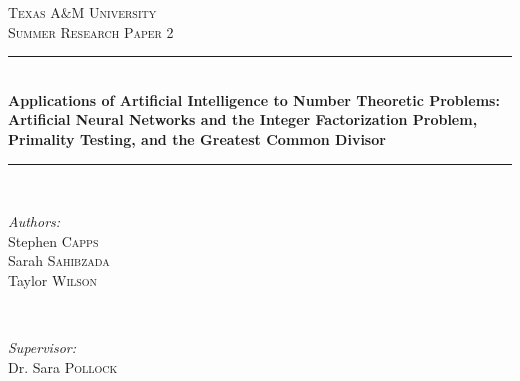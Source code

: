 \documentclass[11pt]{article}
\begin{document}
\begin{titlepage}

\newcommand{\HRule}{\rule{\linewidth}{0.5mm}} 

\center %
 

\textsc{\LARGE Texas A$\&$M University}\\[1.5cm] 
\textsc{\Large Summer Research Paper 2}\\[0.5cm] %


\HRule \\[0.4cm]
{ \huge \bfseries Applications of Artificial Intelligence to Number Theoretic Problems: Artificial Neural Networks and the Integer Factorization Problem, Primality Testing, and the Greatest Common Divisor}\\[0.4cm]  %
\HRule \\[1.5cm]
 

\begin{minipage}{0.4\textwidth}
\begin{flushleft} \large
\emph{Authors:}\\
Stephen \textsc{Capps}\\
Sarah \textsc{Sahibzada}\\
Taylor \textsc{Wilson}
\end{flushleft}
\end{minipage}
~
\begin{minipage}{0.4\textwidth}
\begin{flushright} \large
\emph{Supervisor:} \\
Dr. Sara \textsc{Pollock} 
\end{flushright}
\end{minipage}\\[4cm]



\end{titlepage}
\end{document}
